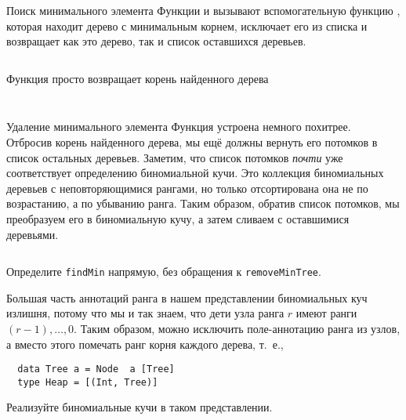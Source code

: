 \begin{frame}[fragile]{Поиск минимального элемента}
Функции  и  вызывают
вспомогательную функцию , которая находит
дерево с минимальным корнем, исключает его из списка и возвращает как
это дерево, так и список оставшихся деревьев.

\inputminted[firstline=28,lastline=32]{haskell}{code/BinomialHeap.lhs}

Функция  просто возвращает корень найденного дерева

\inputminted[firstline=40,lastline=41,gobble=2] {haskell}{code/BinomialHeap.lhs}
\inputminted[firstline=9,lastline=9] {haskell}{code/BinomialHeap.lhs}
\end{frame}

\begin{frame}[fragile]{Удаление минимального элемента}
Функция  устроена немного похитрее. \\

 Отбросив
корень найденного дерева, мы ещё должны вернуть его потомков в список
остальных деревьев. Заметим, что список потомков \emph{почти} уже
соответствует определению биномиальной кучи. Это коллекция
биномиальных деревьев с неповторяющимися рангами, но только
отсортирована она не по возрастанию, а по убыванию ранга. Таким
образом, обратив список потомков, мы преобразуем его в биномиальную
кучу, а затем сливаем с оставшимися деревьями.

\inputminted[firstline=43,lastline=44,gobble=2] {haskell}{code/BinomialHeap.lhs}
\end{frame}

\ifanswers
\begin{frame}[fragile]{}
\begin{exercise}\label{ex:3.5}
  Определите \lstinline!findMin! напрямую, без обращения к \lstinline!removeMinTree!.
\end{exercise}

\begin{exercise}\label{ex:3.6}
  Большая часть аннотаций ранга в нашем представлении биномиальных куч
  излишня, потому что мы и так знаем, что дети узла ранга $r$ имеют
  ранги $(r\!-\!1), \ldots, 0$. Таким образом, можно исключить
  поле-аннотацию ранга из узлов, а вместо этого помечать ранг корня
  каждого дерева, т.~е.,
  \begin{verbatim}
  data Tree a = Node  a [Tree]
  type Heap = [(Int, Tree)]
  \end{verbatim}
  Реализуйте биномиальные кучи в таком представлении.
\end{exercise}
\end{frame}

